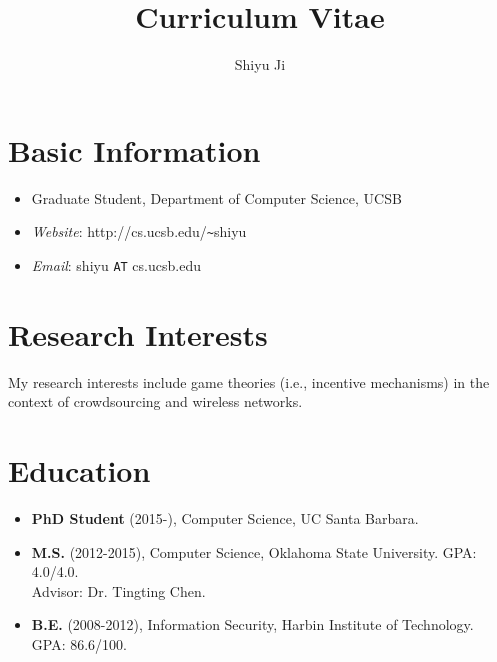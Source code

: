 \documentclass{article}
\begin{document}
\title{\bf Curriculum Vitae}
\author{Shiyu Ji}
\date{}
\maketitle

\section{{Basic Information}}
\begin{itemize}
\item Graduate Student, Department of Computer Science, UCSB
\item {\it Website}: http://cs.ucsb.edu/\verb+~+shiyu
\item {\it Email}: shiyu \verb+AT+ cs.ucsb.edu
\end{itemize}

\section{{Research Interests}}
My research interests include game theories (i.e., incentive mechanisms) in the context of crowdsourcing and wireless networks.

\section{{Education}}
\begin{itemize}
\item {\bf PhD Student} (2015-), Computer Science, UC Santa Barbara.

\item {\bf M.S.} (2012-2015), Computer Science, Oklahoma State University. GPA: 4.0/4.0.\\
Advisor: Dr. Tingting Chen.

\item {\bf B.E.} (2008-2012), Information Security, Harbin Institute of Technology. GPA: 86.6/100.
\end{itemize}
\end{document}
